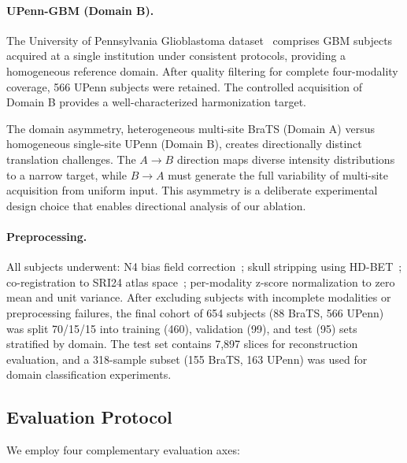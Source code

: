 \documentclass{article}
\begin{document}
\paragraph{UPenn-GBM (Domain B).}
The University of Pennsylvania Glioblastoma dataset~\cite{bakas2022upenn} comprises
GBM subjects acquired at a single institution under consistent protocols, providing a
homogeneous reference domain. After quality filtering for complete four-modality
coverage, 566 UPenn subjects were retained. The controlled acquisition of Domain B
provides a well-characterized harmonization target.

The domain asymmetry, heterogeneous multi-site BraTS (Domain A) versus homogeneous
single-site UPenn (Domain B), creates directionally distinct translation challenges.
The $A \to B$ direction maps diverse intensity distributions to a narrow target, while
$B \to A$ must generate the full variability of multi-site acquisition from uniform input.
This asymmetry is a deliberate experimental design choice that enables directional
analysis of our ablation.

\paragraph{Preprocessing.}
All subjects underwent: N4 bias field correction~\cite{tustison2010n4itk}; skull
stripping using HD-BET~\cite{isensee2019hdbet}; co-registration to SRI24 atlas
space~\cite{rohlfing2010sri24}; per-modality z-score
normalization to zero mean and unit variance. After excluding subjects with incomplete
modalities or preprocessing failures, the final cohort of 654 subjects (88 BraTS,
566 UPenn) was split 70/15/15 into training (460), validation (99), and test (95) sets
stratified by domain. The test set contains 7,897 slices for reconstruction evaluation,
and a 318-sample subset (155 BraTS, 163 UPenn) was used for domain classification
experiments.

\subsection{Evaluation Protocol}

We employ four complementary evaluation axes:
\end{document}
